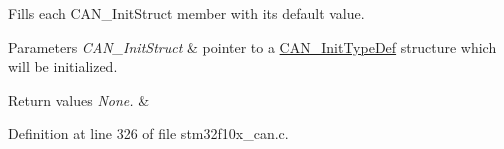 Fills each C\+A\+N\+\_\+\+Init\+Struct member with its default value. 


\begin{DoxyParams}{Parameters}
{\em C\+A\+N\+\_\+\+Init\+Struct} & pointer to a \hyperlink{struct_c_a_n___init_type_def}{C\+A\+N\+\_\+\+Init\+Type\+Def} structure which will be initialized. \\
\hline
\end{DoxyParams}

\begin{DoxyRetVals}{Return values}
{\em None.} & \\
\hline
\end{DoxyRetVals}


Definition at line 326 of file stm32f10x\+\_\+can.\+c.

